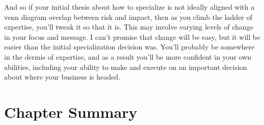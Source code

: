 And so if your initial thesis about how to specialize is not ideally aligned with a venn diagram overlap between risk and impact, then as you climb the ladder of expertise, you'll tweak it so that it is. This may involve varying levels of change in your focus and message. I can't promise that change will be easy, but it will be easier than the initial specialization decision was. You'll probably be somewhere in the dermis of expertise, and as a result you'll be more confident in your own abilities, including your ability to make and execute on an important decision about where your business is headed.

\section{Chapter Summary}